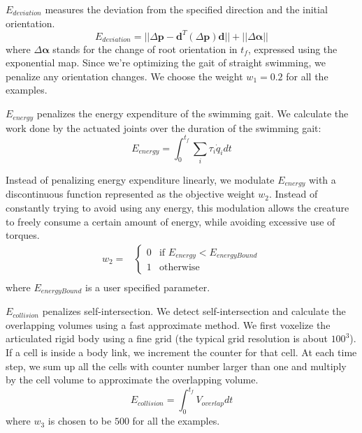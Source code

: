 $E_{deviation}$ measures the deviation from the specified direction and the initial orientation.
\begin{displaymath}
E_{deviation}=||\Delta\mathbf{p}-\mathbf{d}^T(\Delta\mathbf{p})\mathbf{d}|| + ||\Delta\mathbf{\alpha}||
\end{displaymath}
where $\Delta\mathbf{\alpha}$ stands for the change of root orientation in $t_f$, expressed using the exponential map. Since we're optimizing the gait of straight swimming, we penalize any orientation changes. We choose the weight $w_1=0.2$ for all the examples.


$E_{energy}$ penalizes the energy expenditure of the swimming gait.  We
calculate the work done by the actuated joints over the duration of the
swimming gait:
\begin{displaymath}
E_{energy}=\int_{0}^{t_f}\sum_i\tau_i\dot{q}_idt
\end{displaymath}

Instead of penalizing energy expenditure linearly, we modulate $E_{energy}$ with a discontinuous function represented as the objective weight $w_2$.  Instead of constantly trying to avoid using any energy, this modulation allows the creature to freely consume a certain amount of energy, while avoiding excessive use of torques.
\begin {displaymath}
\begin{array}{ll}
w_2 = & \left\{ \begin{array}{ll}
0 & \textrm{if }E_{energy} < E_{energyBound}\\
1 & \textrm{otherwise}
\end{array} \right. \\
\end{array}
\end {displaymath}
where $E_{energyBound}$ is a user specified parameter.

$E_{collision}$ penalizes self-intersection. We detect self-intersection
and calculate the overlapping volumes using a fast approximate method.
We first voxelize the articulated rigid body using a fine grid (the
typical grid resolution is about $100^3$). If a cell is inside a body
link, we increment the counter for that cell. At each time step, we sum up
all the cells with counter number larger than one and multiply by the
cell volume to approximate the overlapping volume.
\begin{displaymath}
E_{collision}=\int_{0} ^{t_f}V_{overlap}dt
\end{displaymath}
where $w_3$ is chosen to be $500$ for all the examples.

